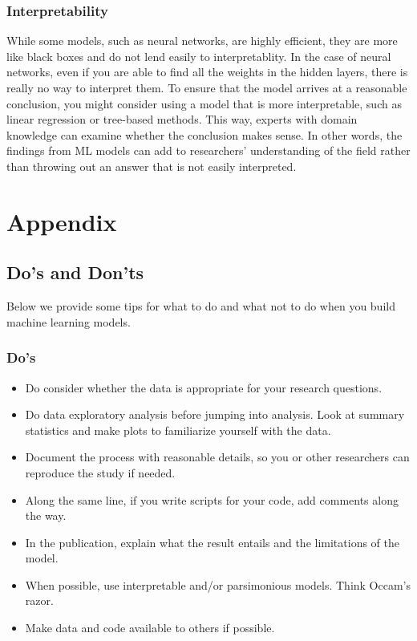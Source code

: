 \documentclass[
]{book}
\providecommand{\tightlist}{%
  \setlength{\itemsep}{0pt}\setlength{\parskip}{0pt}}
\begin{document}
\hypertarget{interpretability}{%
\subsection{Interpretability}\label{interpretability}}

While some models, such as neural networks, are highly efficient, they are more like black boxes and do not lend easily to interpretablity. In the case of neural networks, even if you are able to find all the weights in the hidden layers, there is really no way to interpret them. To ensure that the model arrives at a reasonable conclusion, you might consider using a model that is more interpretable, such as linear regression or tree-based methods. This way, experts with domain knowledge can examine whether the conclusion makes sense. In other words, the findings from ML models can add to researchers' understanding of the field rather than throwing out an answer that is not easily interpreted.

\hypertarget{appendix}{%
\chapter{Appendix}\label{appendix}}

\hypertarget{dos-and-donts}{%
\section{Do's and Don'ts}\label{dos-and-donts}}

Below we provide some tips for what to do and what not to do when you build machine learning models.

\hypertarget{dos}{%
\subsection{Do's}\label{dos}}

\begin{itemize}
\tightlist
\item
  Do consider whether the data is appropriate for your research questions.
\item
  Do data exploratory analysis before jumping into analysis. Look at summary statistics and make plots to familiarize yourself with the data.
\item
  Document the process with reasonable details, so you or other researchers can reproduce the study if needed.
\item
  Along the same line, if you write scripts for your code, add comments along the way.
\item
  In the publication, explain what the result entails and the limitations of the model.
\item
  When possible, use interpretable and/or parsimonious models. Think Occam's razor.
\item
  Make data and code available to others if possible.
\end{itemize}
\end{document}

